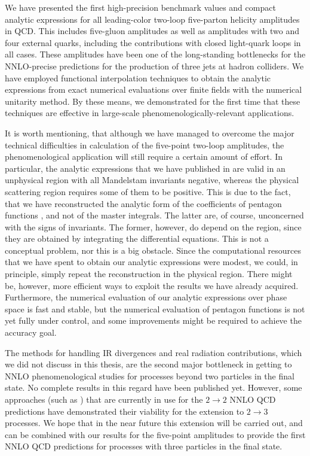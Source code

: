 We have presented the first high-precision benchmark values and compact analytic expressions
for all leading-color two-loop five-parton helicity amplitudes in QCD. This includes
five-gluon amplitudes as well as amplitudes with two and four
external quarks, including the contributions with closed light-quark loops in all cases.
These amplitudes have been one of the long-standing bottlenecks for the NNLO-precise predictions for the production of three jets at hadron colliders.
We have employed functional interpolation techniques to obtain the analytic expressions from exact numerical evaluations over finite fields
with the numerical unitarity method.
By these means, we demonstrated for the first time that these techniques are effective in large-scale phenomenologically-relevant applications.

It is worth mentioning,
that although we have managed to overcome the major technical difficulties in calculation of the five-point two-loop amplitudes,
the phenomenological application will still require a certain amount of effort. In particular,
the analytic expressions that we have published in \cite{Abreu:2019odu} are valid in an unphysical region with all Mandelstam invariants negative, whereas
the physical scattering region requires some of them to be positive.
This is due to the fact, that we have reconstructed the analytic form of the coefficients of pentagon functions \cite{Gehrmann:2018yef}, and not of the master integrals.
The latter are, of course, unconcerned with the signs of invariants.
The former, however, do depend on the region, since they are obtained by integrating the differential equations.
This is not a conceptual problem, nor this is a big obstacle.
Since the computational resources that we have spent to obtain our analytic expressions were modest, we
could, in principle, simply repeat the reconstruction in the physical region.
There might be, however, more efficient ways to exploit the results we have already acquired.
Furthermore, the numerical evaluation of our analytic expressions over phase space is fast and stable,
but the numerical evaluation of pentagon functions is not yet fully under control, and some improvements might be required to 
achieve the accuracy goal. 

The methods for handling IR divergences and real radiation contributions, which we did not discuss in this thesis,
are the second major bottleneck in getting to NNLO phenomenological studies for processes beyond
two particles in the final state. No complete results in this regard have been published yet.
However, some approaches (such as \cite{GehrmannDeRidder:2005cm,Czakon:2010td,Currie:2013vh}) that are currently in use for the $2\to 2$
NNLO QCD predictions have demonstrated their viability for the extension to $2\to 3$ processes.
We hope that in the near future this extension will be carried out, and can be combined with our results for the five-point amplitudes
to provide the first NNLO QCD predictions for processes with three particles in the final state.


